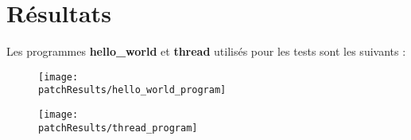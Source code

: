 
\chapter*{Résultats}

Les programmes \textbf{hello\_world} et \textbf{thread} utilisés pour les
tests sont les suivants :

\begin{figure}[H]
	\begin{center}
		\texttt{[image: \\patchResults/hello\_world\_program]}
	\end{center}
\end{figure}

\begin{figure}[H]
	\begin{center}
		\texttt{[image: \\patchResults/thread\_program]}
	\end{center}
\end{figure}






